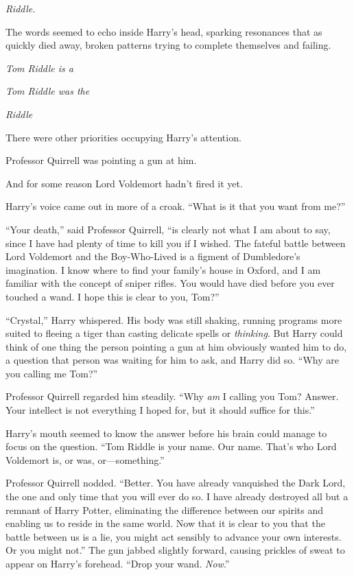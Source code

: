 
 \emph{Riddle.}

\hplettrineextrapara
The words seemed to echo inside Harry’s head, sparking resonances that as quickly died away, broken patterns trying to complete themselves and failing.

\emph{Tom Riddle is a}

\emph{Tom Riddle was the}

\emph{Riddle}

There were other priorities occupying Harry’s attention.

Professor Quirrell was pointing a gun at him.

And for some reason Lord Voldemort hadn’t fired it yet.

Harry’s voice came out in more of a croak. “What is it that you want from me?”

“Your death,” said Professor Quirrell, “is clearly not what I am about to say, since I have had plenty of time to kill you if I wished. The fateful battle between Lord Voldemort and the Boy-Who-Lived is a figment of Dumbledore’s imagination. I know where to find your family’s house in Oxford, and I am familiar with the concept of sniper rifles. You would have died before you ever touched a wand. I hope this is clear to you, Tom?”

“Crystal,” Harry whispered. His body was still shaking, running programs more suited to fleeing a tiger than casting delicate spells or \emph{thinking}. But Harry could think of one thing the person pointing a gun at him obviously wanted him to do, a question that person was waiting for him to ask, and Harry did so. “Why are you calling me Tom?”

Professor Quirrell regarded him steadily. “Why \emph{am} I calling you Tom? Answer. Your intellect is not everything I hoped for, but it should suffice for this.”

Harry’s mouth seemed to know the answer before his brain could manage to focus on the question. “Tom Riddle is your name. Our name. That’s who Lord Voldemort is, or was, or—something.”

Professor Quirrell nodded. “Better. You have already vanquished the Dark Lord, the one and only time that you will ever do so. I have already destroyed all but a remnant of Harry Potter, eliminating the difference between our spirits and enabling us to reside in the same world. Now that it is clear to you that the battle between us is a lie, you might act sensibly to advance your own interests. Or you might not.” The gun jabbed slightly forward, causing prickles of sweat to appear on Harry’s forehead. “Drop your wand. \emph{Now}.”


